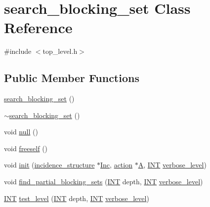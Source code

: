 \hypertarget{classsearch__blocking__set}{}\section{search\+\_\+blocking\+\_\+set Class Reference}
\label{classsearch__blocking__set}


{\ttfamily \#include $<$top\+\_\+level.\+h$>$}

\subsection*{Public Member Functions}
\begin{DoxyCompactItemize}
\item 
\mbox{\hyperlink{classsearch__blocking__set_a6076edc87a45e46e63906c624e16f71d}{search\+\_\+blocking\+\_\+set}} ()
\item 
\mbox{\hyperlink{classsearch__blocking__set_a4b1331adc5c666c6a4712e81bba39f5a}{$\sim$search\+\_\+blocking\+\_\+set}} ()
\item 
void \mbox{\hyperlink{classsearch__blocking__set_a3fec3d8470f2bf29fa5d67f575ef8e2d}{null}} ()
\item 
void \mbox{\hyperlink{classsearch__blocking__set_ab58badb2d8f9653216be9510be9f4873}{freeself}} ()
\item 
void \mbox{\hyperlink{classsearch__blocking__set_aac1efd7849b1b2597653d2a409144356}{init}} (\mbox{\hyperlink{classincidence__structure}{incidence\+\_\+structure}} $\ast$\mbox{\hyperlink{classsearch__blocking__set_a93fa339b01d40f2ef959837b194dc8a8}{Inc}}, \mbox{\hyperlink{classaction}{action}} $\ast$\mbox{\hyperlink{classsearch__blocking__set_a491c18c26a74e9a4d6d6ac3874fb1ed3}{A}}, \mbox{\hyperlink{galois_8h_a09fddde158a3a20bd2dcadb609de11dc}{I\+NT}} \mbox{\hyperlink{simeon_8_c_a818073fbcc2f439e7c56952f67386122}{verbose\+\_\+level}})
\item 
void \mbox{\hyperlink{classsearch__blocking__set_ad3fdb3d356db75a02c406bc9d4e9e9b6}{find\+\_\+partial\+\_\+blocking\+\_\+sets}} (\mbox{\hyperlink{galois_8h_a09fddde158a3a20bd2dcadb609de11dc}{I\+NT}} depth, \mbox{\hyperlink{galois_8h_a09fddde158a3a20bd2dcadb609de11dc}{I\+NT}} \mbox{\hyperlink{simeon_8_c_a818073fbcc2f439e7c56952f67386122}{verbose\+\_\+level}})
\item 
\mbox{\hyperlink{galois_8h_a09fddde158a3a20bd2dcadb609de11dc}{I\+NT}} \mbox{\hyperlink{classsearch__blocking__set_a438d1a418dc20c5ad05b533fa881729d}{test\+\_\+level}} (\mbox{\hyperlink{galois_8h_a09fddde158a3a20bd2dcadb609de11dc}{I\+NT}} depth, \mbox{\hyperlink{galois_8h_a09fddde158a3a20bd2dcadb609de11dc}{I\+NT}} \mbox{\hyperlink{simeon_8_c_a818073fbcc2f439e7c56952f67386122}{verbose\+\_\+level}})

\end{DoxyCompactItemize}
